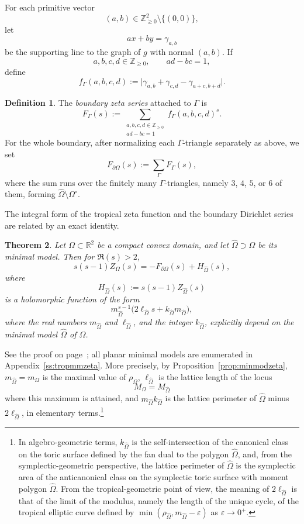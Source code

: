 \documentclass[a4paper,american,11pt]{amsart}
\theoremstyle{plain}
\newtheorem{theorem}{Theorem}[section]
\theoremstyle{definition}
\newtheorem{definition}[theorem]{Definition}
\newcommand{\Z}{\mathbb Z}
\newcommand{\R}{\mathbb R}
\begin{document}
For each primitive vector
\[
(a,b)\in \Z_{\ge0}^2\setminus\{(0,0)\},
\]
let
\[
ax+by=\gamma_{a,b}
\]
be the supporting line to the graph of \(g\) with normal \((a,b)\). If
\[
a,b,c,d\in \Z_{\ge0},
\qquad
ad-bc=1,
\]
define
\[
f_\Gamma(a,b,c,d)
:=
\bigl|\gamma_{a,b}+\gamma_{c,d}-\gamma_{a+c,b+d}\bigr|.
\]

\begin{definition}
The \emph{boundary zeta series} attached to \(\Gamma\) is
\[
F_\Gamma(s)
:=
\sum_{\substack{a,b,c,d\in\Z_{\ge0}\\ ad-bc=1}}
f_\Gamma(a,b,c,d)^s.
\]
For the whole boundary, after normalizing each \(\Gamma\)-triangle separately
as above, we set
\[
F_{\partial\Omega}(s):=\sum_{\Gamma}F_\Gamma(s),
\]
where the sum runs over the finitely many \(\Gamma\)-triangles, namely
\(3\), \(4\), \(5\), or \(6\) of them, forming
\(\widehat\Omega\setminus\Omega^\circ\).
\end{definition}

The integral form of the tropical zeta function and the boundary Dirichlet
series are related by an exact identity.

\begin{theorem}\label{thm:integral-boundary}
Let \(\Omega\subset \R^2\) be a compact convex domain, and let
\(\widehat\Omega\supset\Omega\) be its minimal model. Then for \(\Re(s)>2\),
\[
s(s-1)Z_\Omega(s)
=
-
F_{\partial\Omega}(s)+H_{\widehat\Omega}(s),
\]
where
\[
H_{\widehat\Omega}(s):=s(s-1)Z_{\widehat\Omega}(s)
\]
is a holomorphic function of the form
\[
m_{\widehat\Omega}^{s-1}
\bigl(2\ell_{\widehat\Omega}s
+k_{\widehat\Omega}m_{\widehat\Omega}\bigr),
\]
where the real numbers \(m_{\widehat\Omega}\) and
\(\ell_{\widehat\Omega}\), and the integer \(k_{\widehat\Omega}\), explicitly
depend on the minimal model \(\widehat\Omega\) of \(\Omega\).
\end{theorem}

See the proof on page~\pageref{proof:thm:integral-boundary}; all planar
minimal models are enumerated in Appendix~\ref{ss:tropmmzeta}. More precisely,
by Proposition~\ref{prop:minmodzeta}, \(m_{\widehat\Omega}=m_{\Omega}\) is the
maximal value of \(\rho_\Omega\), \(\ell_{\widehat\Omega}\) is the lattice
length of the locus
\[
M_\Omega=M_{\widehat\Omega}
\]
where this maximum is attained, and \(m_{\widehat\Omega}k_{\widehat\Omega}\)
is the lattice perimeter of \(\widehat\Omega\) minus
\(2\ell_{\widehat\Omega}\), in elementary terms.\footnote{In
algebro-geometric terms, \(k_{\widehat\Omega}\) is the self-intersection of
the canonical class on the toric surface defined by the fan dual to the
polygon \(\widehat\Omega\), and, from the symplectic-geometric perspective,
the lattice perimeter of \(\widehat\Omega\) is the symplectic area of the
anticanonical class on the symplectic toric surface with moment polygon
\(\widehat\Omega\). From the tropical-geometric point of view, the meaning of
\(2\ell_{\widehat\Omega}\) is that of the limit of the modulus, namely the
length of the unique cycle, of the tropical elliptic curve defined by
\(\min(\rho_{\widehat\Omega},m_{\widehat\Omega}-\varepsilon)\) as
\(\varepsilon\to0^+\).}
\end{document}
